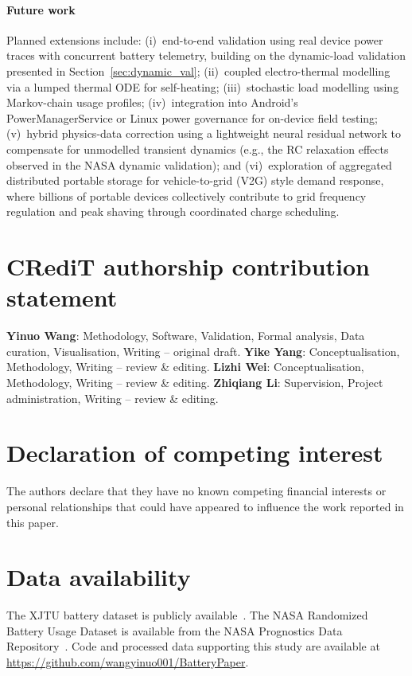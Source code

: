 \documentclass[5p,times,number]{elsarticle}
\newcommand{\secref}[1]{\hyperref[#1]{\textup{Section~\ref*{#1}}}}
\def\secref#1{Section~\ref{#1}}
\begin{document}
\paragraph{Future work}
Planned extensions include:
(i)~end-to-end validation using real device power traces with concurrent battery telemetry, building on the dynamic-load validation presented in \secref{sec:dynamic_val};
(ii)~coupled electro-thermal modelling via a lumped thermal ODE for self-heating;
(iii)~stochastic load modelling using Markov-chain usage profiles;
(iv)~integration into Android's PowerManagerService or Linux power governance for on-device field testing;
(v)~hybrid physics-data correction using a lightweight neural residual network to compensate for unmodelled transient dynamics (e.g., the RC relaxation effects observed in the NASA dynamic validation);
and (vi)~exploration of aggregated distributed portable storage for vehicle-to-grid (V2G) style demand response, where billions of portable devices collectively contribute to grid frequency regulation and peak shaving through coordinated charge scheduling.

\section*{CRediT authorship contribution statement}
\textbf{Yinuo Wang}: Methodology, Software, Validation, Formal analysis, Data curation, Visualisation, Writing -- original draft.
\textbf{Yike Yang}: Conceptualisation, Methodology, Writing -- review \& editing.
\textbf{Lizhi Wei}: Conceptualisation, Methodology, Writing -- review \& editing.
\textbf{Zhiqiang Li}: Supervision, Project administration, Writing -- review \& editing.

\section*{Declaration of competing interest}
The authors declare that they have no known competing financial interests or personal relationships that could have appeared to influence the work reported in this paper.

\section*{Data availability}
The XJTU battery dataset is publicly available~\cite{XJTU2020}. The NASA Randomized Battery Usage Dataset is available from the NASA Prognostics Data Repository~\cite{Bole2014}. Code and processed data supporting this study are available at \url{https://github.com/wangyinuo001/BatteryPaper}.
\end{document}
